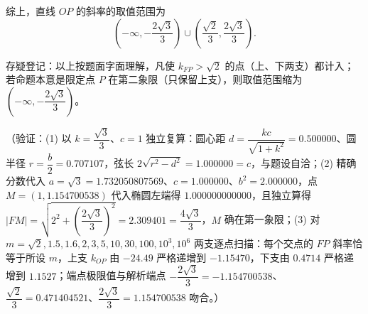 \begin{answer}
综上，直线 \(OP\) 的斜率的取值范围为
\nopagebreak[4]
\[
\left(-\infty,-\dfrac{2\sqrt{3}}{3}\right)\cup\left(\dfrac{\sqrt{2}}{3},\dfrac{2\sqrt{3}}{3}\right).
\]

存疑登记：以上按题面字面理解，凡使 \(k_{FP}>\sqrt{2}\) 的点（上、下两支）都计入；若命题本意是限定点 \(P\) 在第二象限（只保留上支），则取值范围缩为 \(\left(-\infty,-\dfrac{2\sqrt{3}}{3}\right)\)。

（验证：(1) 以 \(k=\dfrac{\sqrt{3}}{3}\)、\(c=1\) 独立复算：圆心距 \(d=\dfrac{kc}{\sqrt{1+k^{2}}}=0.500000\)、圆半径 \(r=\dfrac{b}{2}=0.707107\)，弦长 \(2\sqrt{r^{2}-d^{2}}=1.000000=c\)，与题设自洽；(2) 精确分数代入 \(a=\sqrt{3}=1.732050807569\)、\(c=1.000000\)、\(b^{2}=2.000000\)，点 \(M=(1,1.154700538)\) 代入椭圆左端得 \(1.000000000000\)，且独立算得 \(|FM|=\sqrt{2^{2}+\left(\dfrac{2\sqrt{3}}{3}\right)^{2}}=2.309401=\dfrac{4\sqrt{3}}{3}\)，\(M\) 确在第一象限；(3) 对 \(m=\sqrt{2},1.5,1.6,2,3,5,10,30,100,10^{3},10^{6}\) 两支逐点扫描：每个交点的 \(FP\) 斜率恰等于所设 \(m\)，上支 \(k_{OP}\) 由 \(-24.49\) 严格递增到 \(-1.15470\)，下支由 \(0.4714\) 严格递增到 \(1.1527\)；端点极限值与解析端点 \(-\dfrac{2\sqrt{3}}{3}=-1.154700538\)、\(\dfrac{\sqrt{2}}{3}=0.471404521\)、\(\dfrac{2\sqrt{3}}{3}=1.154700538\) 吻合。）




\end{answer}
